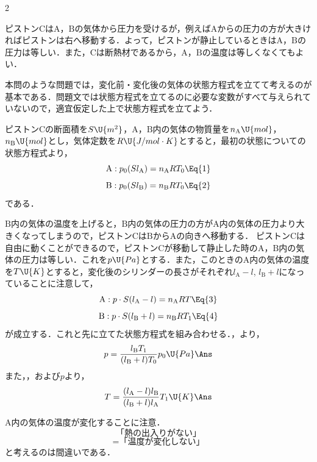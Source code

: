 \begin{multicols}{2}
\par\nopagebreak
\begin{sisin}
ピストン$\mathrm{C}$は$\mathrm{A}$，$\mathrm{B}$の気体から圧力を受けるが，例えば$\mathrm{A}$からの圧力の方が大きければピストンは右へ移動する．よって，ピストンが静止しているときは$\mathrm{A}$，$\mathrm{B}$の圧力は等しい．また，$\mathrm{C}$は断熱材であるから，$\mathrm{A}$，$\mathrm{B}$の温度は等しくなくてもよい．

本問のような問題では，変化前・変化後の気体の状態方程式を立てて考えるのが基本である．問題文では状態方程式を立てるのに必要な変数がすべて与えられていないので，適宜仮定した上で状態方程式を立てよう．
\end{sisin}
\par\nopagebreak
\hspace{1zw}ピストン$\mathrm{C}$の断面積を$S\U{m^2}$，$\mathrm{A}$，$\mathrm{B}$内の気体の物質量を$n_{\mathrm{A}}\U{mol}$，$n_{\mathrm{B}}\U{mol}$とし，気体定数を$R\U{J/mol\cdot K}$とすると，最初の状態についての状態方程式より，
\[\mathrm{A}:p_0(Sl_{\mathrm{A}})=n_{\mathrm{A}}RT_0\Eq{1}\]
\[\mathrm{B}:p_0(Sl_{\mathrm{B}})=n_{\mathrm{B}}RT_0\Eq{2}\]
である．
\begin{komon}
 $\mathrm{B}$内の気体の温度を上げると，$\mathrm{B}$内の気体の圧力の方が$\mathrm{A}$内の気体の圧力より大きくなってしまうので，ピストン$\mathrm{C}$は$\mathrm{B}$から$\mathrm{A}$の向きへ移動する．\Ans
{} ピストン$\mathrm{C}$は自由に動くことができるので，ピストン$\mathrm{C}$が移動して静止した時の$\mathrm{A}$，$\mathrm{B}$内の気体の圧力は等しい．これを$p\U{Pa}$とする．また，このときの$\mathrm{A}$内の気体の温度を$T\U{K}$とすると，変化後のシリンダーの長さがそれぞれ$l_{\mathrm{A}}-l$, $l_{\mathrm{B}}+l$になっていることに注意して，
       \[\mathrm{A}:p\cdot S(l_{\mathrm{A}}-l)=n_{\mathrm{A}}RT\Eq{3}\]
       \[\mathrm{B}:p\cdot S(l_{\mathrm{B}}+l)=n_{\mathrm{B}}RT_1\Eq{4}\]
       が成立する．これと先に立てた状態方程式を組み合わせる．，より，
       \[p=\frac{l_{\mathrm{B}}T_1}{(l_{\mathrm{B}}+l)T_0}p_0\U{Pa}\Ans\]
       また，，および$p$より，
       \[T=\frac{(l_{\mathrm{A}}-l)l_{\mathrm{B}}}{(l_{\mathrm{B}}+l)l_{\mathrm{A}}}T_1\U{K}\Ans\]
\end{komon}
\begin{chuu}
\hspace{1zw}$\mathrm{A}$内の気体の温度が変化することに注意．
\[\mbox{「熱の出入りがない」}\]
\[=\mbox{「温度が変化しない」}\]
と考えるのは間違いである．
\end{chuu}


\end{multicols}

